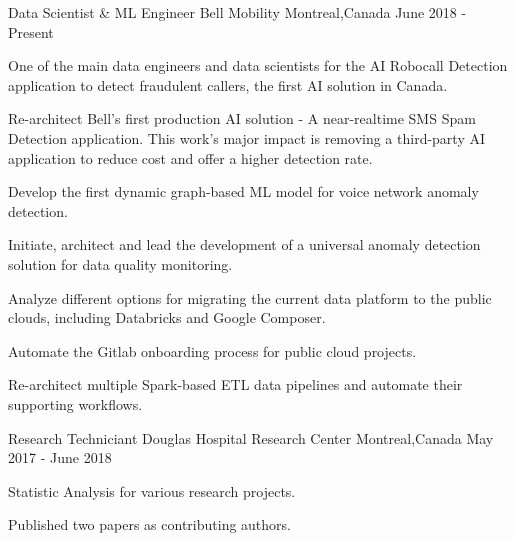 \documentclass[11pt, a4paper]{awesome-cv} %
\begin{document}





\begin{cventries}
	
	\cventry
	{Data Scientist \& ML Engineer} %
	{Bell Mobility} %
	{Montreal,Canada} %
	{June 2018 - Present} %
	{ %
		\begin{cvitems}
		\item {One of the main data engineers and data scientists for the AI Robocall Detection application to detect fraudulent callers, the first AI solution in Canada.}
		\item {Re-architect Bell's first production AI solution - A near-realtime SMS Spam Detection application. This work's major impact is removing a third-party AI application to reduce cost and offer a higher detection rate.}
		\item {Develop the first dynamic graph-based ML model for voice network anomaly detection. }
		\item {Initiate, architect and lead the development of a universal anomaly detection solution for data quality monitoring.}
		\item {Analyze different options for migrating the current data platform to the public clouds, including Databricks and Google Composer.}
		\item {Automate the Gitlab onboarding process for public cloud projects.}
		\item {Re-architect multiple Spark-based ETL data pipelines and automate their supporting workflows.}
		\end{cvitems}
	}
	
	\cventry
	{Research Techniciant} %
	{Douglas Hospital Research Center} %
	{Montreal,Canada} %
	{May 2017 - June 2018} %
	{ %
		\begin{cvitems}
			\item {Statistic Analysis for various research projects.}
			\item {Published two papers as contributing authors.}
		\end{cvitems}
	}
	

\end{cventries}
\end{document}
